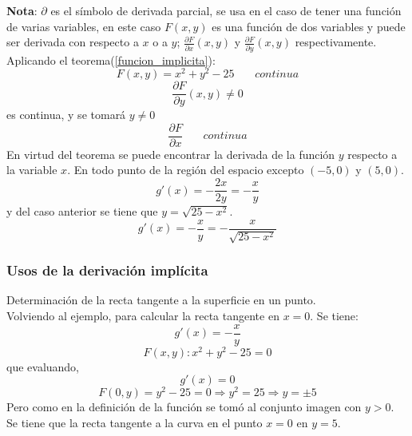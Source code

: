 \documentclass[10pt,twoside]{SelfArx} %
\begin{document}
\textbf{Nota}: $ \partial $ es el símbolo de derivada parcial, se usa en el caso de tener una función de varias variables, en este caso $ F(x,y) $ es una función de dos variables y puede ser derivada con respecto a $ x $ o a $ y $; $ \frac{\partial F}{\partial x}(x,y) $ y $ \frac{\partial F}{\partial y}(x,y)  $ respectivamente.\\

Aplicando el teorema(\ref{funcion_implicita}):\\
\begin{equation}
 F(x,y)=x^{2}+y^{2}-25\,\,\,\,\,\,\,\,\,\,\, continua 
\end{equation}
\begin{equation}
 \frac{\partial F}{\partial y}(x,y)\neq0  
\end{equation}
es continua, y se tomar\'a $ y\neq0 $
\begin{equation}
 \dfrac{\partial F}{\partial x} \,\,\,\,\,\,\,\,\,\,\, continua 
\end{equation}
	En virtud del teorema se puede encontrar la derivada de la función $ y $ respecto a la variable $ x $. En todo punto de la región del espacio excepto $ (-5,0) $ y $ (5,0) $.\\
\begin{equation}
	 g'(x)=-\frac{2x}{2y}=-\frac{x}{y} 
\end{equation}
y del caso anterior se tiene que $ y=\sqrt{25-x^{2}} $.\\
\begin{equation}
	 g'(x)=-\frac{x}{y}=-\frac{x}{\sqrt{25-x^{2}}} 
\end{equation}
	
\subsubsection{Usos de la derivación implícita}
	Determinación de la recta tangente a la superficie en un punto.\\
	Volviendo al ejemplo, para calcular la recta tangente en $ x=0 $.
	 Se tiene:
\begin{equation}
	  g'(x)=-\frac{x}{y} 
\end{equation}
\begin{equation}
	  F(x,y):x^{2}+y^{2}-25=0 
\end{equation}
	 que evaluando,
\begin{equation}
	 g'(x)=0 
\end{equation}
\begin{equation}
	  F(0,y)=y^{2}-25=0\Rightarrow y^{2}=25\Rightarrow y=\pm5 
\end{equation}
	 Pero como en la definición de la función se tomó al conjunto imagen con $ y>0 $. Se tiene que la recta tangente a la curva en el punto $ x=0 $ en $ y=5 $.
	
\end{document}
